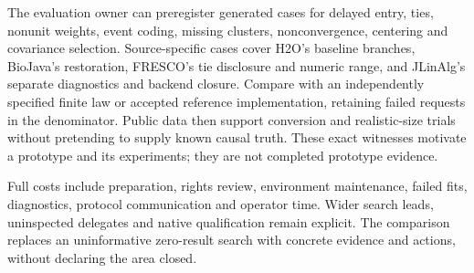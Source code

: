 The evaluation owner can preregister generated cases for delayed entry,
ties, nonunit weights, event coding, missing clusters, nonconvergence,
centering and covariance selection. Source-specific cases cover H2O's
baseline branches, BioJava's restoration, FRESCO's tie disclosure and numeric
range, and JLinAlg's separate diagnostics and backend closure. Compare with
an independently specified finite law or accepted reference implementation,
retaining failed requests in the denominator. Public data then support
conversion and realistic-size trials without pretending to supply known
causal truth. These exact witnesses motivate a prototype and its experiments;
they are not completed prototype evidence. \citep{exec24_longjava_reference}

Full costs include preparation, rights review, environment maintenance,
failed fits, diagnostics, protocol communication and operator time. Wider
search leads, uninspected delegates and native qualification remain explicit.
The comparison replaces an uninformative zero-result search with concrete
evidence and actions, without declaring the area closed.
